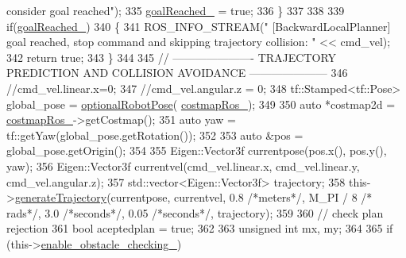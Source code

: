 \begin{DoxyCode}
{{       consider goal reached"});
335                 \hyperlink{classcl__move__base__z_1_1backward__local__planner_1_1BackwardLocalPlanner_ad443c52ef585a8eab0364f0909222f51}{goalReached\_} = \textcolor{keyword}{true};
336             \}
337 
338 
339             \textcolor{keywordflow}{if}(\hyperlink{classcl__move__base__z_1_1backward__local__planner_1_1BackwardLocalPlanner_ad443c52ef585a8eab0364f0909222f51}{goalReached\_})
340             \{
341                 ROS\_INFO\_STREAM(\textcolor{stringliteral}{" [BackwardLocalPlanner] goal reached, stop command and skipping trajectory
       collision: "} << cmd\_vel);
342                 \textcolor{keywordflow}{return} \textcolor{keyword}{true};
343             \}
344 
345             \textcolor{comment}{// ---------------------- TRAJECTORY PREDICTION AND COLLISION AVOIDANCE ---------------------}
346             \textcolor{comment}{//cmd\_vel.linear.x=0;}
347             \textcolor{comment}{//cmd\_vel.angular.z = 0;}
348             tf::Stamped<tf::Pose> global\_pose = \hyperlink{namespacecl__move__base__z_1_1backward__local__planner_afd5bb2a0d144f7b89f4215fbcb1fbe69}{optionalRobotPose}(
      \hyperlink{classcl__move__base__z_1_1backward__local__planner_1_1BackwardLocalPlanner_a4136268882a105d9e06e173d85d5c0dc}{costmapRos\_});
349 
350             \textcolor{keyword}{auto} *costmap2d = \hyperlink{classcl__move__base__z_1_1backward__local__planner_1_1BackwardLocalPlanner_a4136268882a105d9e06e173d85d5c0dc}{costmapRos\_}->getCostmap();
351             \textcolor{keyword}{auto} yaw = tf::getYaw(global\_pose.getRotation());
352 
353             \textcolor{keyword}{auto} &pos = global\_pose.getOrigin();
354 
355             Eigen::Vector3f currentpose(pos.x(), pos.y(), yaw);
356             Eigen::Vector3f currentvel(cmd\_vel.linear.x, cmd\_vel.linear.y, cmd\_vel.angular.z);
357             std::vector<Eigen::Vector3f> trajectory;
358             this->\hyperlink{classcl__move__base__z_1_1backward__local__planner_1_1BackwardLocalPlanner_a9e8921ca8ce379ca8ba321f82ca23cdc}{generateTrajectory}(currentpose, currentvel, 0.8 \textcolor{comment}{/*meters*/}, M\_PI / 8 \textcolor{comment}{/*
      rads*/}, 3.0 \textcolor{comment}{/*seconds*/}, 0.05 \textcolor{comment}{/*seconds*/}, trajectory);
359 
360             \textcolor{comment}{// check plan rejection}
361             \textcolor{keywordtype}{bool} aceptedplan = \textcolor{keyword}{true};
362 
363             \textcolor{keywordtype}{unsigned} \textcolor{keywordtype}{int} mx, my;
364 
365             \textcolor{keywordflow}{if} (this->\hyperlink{classcl__move__base__z_1_1backward__local__planner_1_1BackwardLocalPlanner_a154043366660cc02ec758dda32817511}{enable\_obstacle\_checking\_})
}
\end{DoxyCode}

